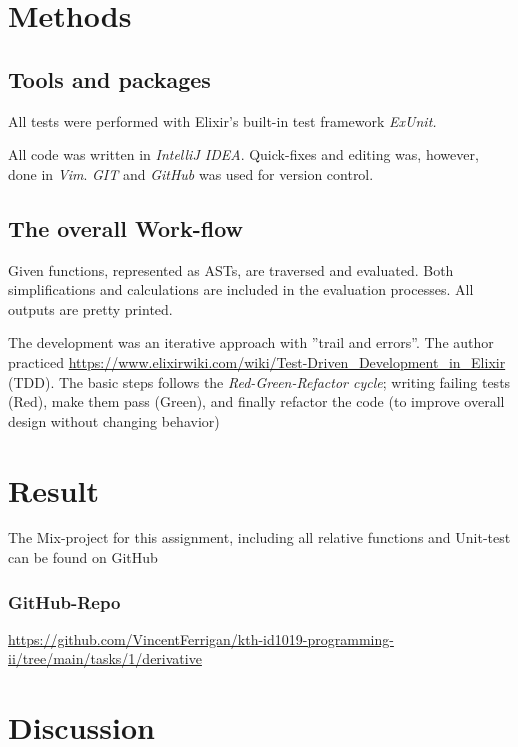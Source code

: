 \documentclass[a4paper,11pt]{article}
\begin{document}
\section*{Methods}
\label{sec:methods}

\subsection*{Tools and packages}
\label{subsec:tools}
All tests were performed with Elixir's built-in test framework \emph{ExUnit.}

All code was written in \emph{IntelliJ IDEA}.
Quick-fixes and editing was, however, done in \emph{Vim}. 
\emph{GIT} and \emph{GitHub} was used for version control.

\subsection*{The overall Work-flow} %
\label{subsec:workflow}
Given functions, represented as ASTs, are traversed and evaluated.
Both simplifications and calculations are included in the evaluation processes.
All outputs are pretty printed.

The development was an iterative approach with ''trail and errors''.
The author practiced
\href{Test Driven Development}{https://www.elixirwiki.com/wiki/Test-Driven_Development_in_Elixir}
(TDD).
The basic steps follows the \emph{Red-Green-Refactor cycle}; writing failing tests (Red), make them pass (Green),
and finally refactor the code (to improve overall design without changing behavior)

\section*{Result}
\label{sec:result}
The Mix-project for this assignment, including all relative functions and Unit-test can be found on GitHub

\subsubsection*{GitHub-Repo}
\url{https://github.com/VincentFerrigan/kth-id1019-programming-ii/tree/main/tasks/1/derivative}



\section*{Discussion}
\label{sec:discussion}
\end{document}
